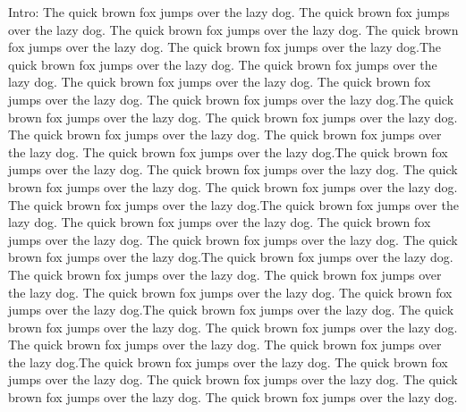Intro: The quick brown fox jumps over the lazy dog.  The quick brown fox jumps over the lazy dog.  The quick brown fox jumps over the lazy dog.  The quick brown fox jumps over the lazy dog.  The quick brown fox jumps over the lazy dog.The quick brown fox jumps over the lazy dog.  The quick brown fox jumps over the lazy dog.  The quick brown fox jumps over the lazy dog.  The quick brown fox jumps over the lazy dog.  The quick brown fox jumps over the lazy dog.The quick brown fox jumps over the lazy dog.  The quick brown fox jumps over the lazy dog.  The quick brown fox jumps over the lazy dog.  The quick brown fox jumps over the lazy dog.  The quick brown fox jumps over the lazy dog.The quick brown fox jumps over the lazy dog.  The quick brown fox jumps over the lazy dog.  The quick brown fox jumps over the lazy dog.  The quick brown fox jumps over the lazy dog.  The quick brown fox jumps over the lazy dog.The quick brown fox jumps over the lazy dog.  The quick brown fox jumps over the lazy dog.  The quick brown fox jumps over the lazy dog.  The quick brown fox jumps over the lazy dog.  The quick brown fox jumps over the lazy dog.The quick brown fox jumps over the lazy dog.  The quick brown fox jumps over the lazy dog.  The quick brown fox jumps over the lazy dog.  The quick brown fox jumps over the lazy dog.  The quick brown fox jumps over the lazy dog.The quick brown fox jumps over the lazy dog.  The quick brown fox jumps over the lazy dog.  The quick brown fox jumps over the lazy dog.  The quick brown fox jumps over the lazy dog.  The quick brown fox jumps over the lazy dog.The quick brown fox jumps over the lazy dog.  The quick brown fox jumps over the lazy dog.  The quick brown fox jumps over the lazy dog. The quick brown fox jumps over the lazy dog.  The quick brown fox jumps over the lazy dog.